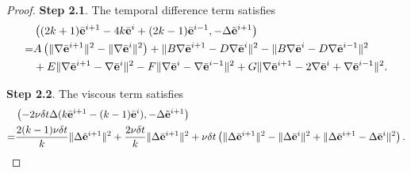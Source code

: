 \documentclass{article}
\theoremstyle{definition}                   %
\begin{document}
\begin{proof}
\vskip 0.2cm
{\bf Step 2.1}.  
The temporal difference term satisfies
\begin{align}
&\left((2k+1)\bar{\mathbf{e}}^{i+1} - 4k\bar{\mathbf{e}}^i + (2k-1)\bar{\mathbf{e}}^{i-1}, -\Delta \tilde{\mathbf{e}}^{i+1} \right) \notag\\
=&A\left(\|\nabla\bar{\mathbf{e}}^{i+1}\|^2 - \|\nabla\bar{\mathbf{e}}^{i}\|^2\right)
+\|B\nabla\bar{\mathbf{e}}^{i+1} - D\nabla\bar{\mathbf{e}}^i\|^2
- \|B\nabla\bar{\mathbf{e}}^{i} - D\nabla\bar{\mathbf{e}}^{i-1}\|^2
\notag\\
& + E\|\nabla\bar{\mathbf{e}}^{i+1} - \nabla\bar{\mathbf{e}}^i\|^2
- F\|\nabla\bar{\mathbf{e}}^{i} - \nabla\bar{\mathbf{e}}^{i-1}\|^2
+G \|\nabla\bar{\mathbf{e}}^{i+1} - 2\nabla\bar{\mathbf{e}}^i + \nabla\bar{\mathbf{e}}^{i-1}\|^2.
\label{5.31-new}
\end{align}

\vskip 0.2cm
{\bf Step 2.2}. 
The viscous term satisfies 
\begin{align}
&\left( -2\nu\delta t \Delta (k\bar{\mathbf{e}}^{i+1}-(k-1)\bar{\mathbf{e}}^i), -\Delta \tilde{\mathbf{e}}^{i+1}\right) \notag\\
=&\frac{2(k-1)\nu\delta t}{k} \|\Delta\hat{\mathbf{e}}^{i+1}\|^2
+ \frac{2\nu\delta t}{k} \|\Delta\bar{\mathbf{e}}^{i+1}\|^2
+ \nu\delta t \left(\|\Delta \bar{\mathbf{e}}^{i+1}\|^2
 - \|\Delta\bar{\mathbf{e}}^i\|^2
 + \|\Delta\bar{\mathbf{e}}^{i+1} - \Delta\bar{\mathbf{e}}^i\|^2\right).
\label{5.32-new}
\end{align}


\end{proof}
\end{document}
